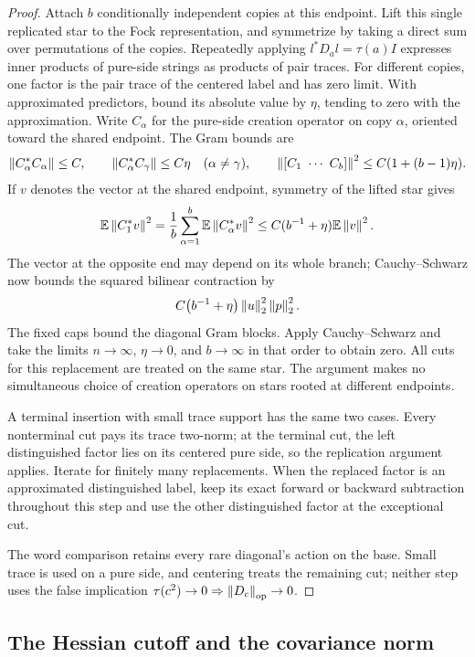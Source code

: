 \begin{proof}
Attach $b$ conditionally independent copies at this endpoint. Lift
this single replicated star to the Fock representation, and symmetrize
by taking a direct sum over permutations of the copies. Repeatedly
applying $l^*D_al=\tau(a)I$ expresses inner products of pure-side strings
as products of pair traces. For different copies, one factor is the
pair trace of the centered label and has zero limit. With approximated
predictors, bound its absolute value by $\eta$, tending to zero with
the approximation. Write $C_\alpha$ for the pure-side creation operator
on copy $\alpha$, oriented toward the shared endpoint. The Gram bounds
are
\[
 \left\lVert C_\alpha^*C_\alpha\right\rVert\leq C,\qquad
 \left\lVert C_\alpha^*C_\gamma\right\rVert\leq C\eta\quad(\alpha\ne\gamma),\qquad
 \left\lVert [C_1\ \cdots\ C_b]\right\rVert^2\leq C(1+(b-1)\eta).
\]
If $v$ denotes the vector at the shared endpoint, symmetry of the
lifted star gives
\[
 \mathbb E\left\lVert C_1^*v\right\rVert^2
 =\frac1b\sum_{\alpha=1}^b\mathbb E\left\lVert C_\alpha^*v\right\rVert^2
 \leq C(b^{-1}+\eta)\mathbb E\left\lVert v\right\rVert^2.
\]
The vector at the opposite end may depend on its whole branch;
Cauchy--Schwarz now bounds the squared bilinear contraction by
\[
 C\bigl(b^{-1}+\eta\bigr)\left\lVert u\right\rVert_2^2\left\lVert p\right\rVert_2^2.
\]
The fixed caps bound the diagonal Gram blocks. Apply Cauchy--Schwarz
and take the limits $n\to\infty$, $\eta\to0$, and $b\to\infty$ in
that order to obtain zero. All cuts for this replacement are treated
on the same star. The argument makes no simultaneous choice of
creation operators on stars rooted at different endpoints.

A terminal insertion with small trace support has the same two cases.
Every nonterminal cut pays its trace two-norm; at the terminal cut,
the left distinguished factor lies on its centered pure side, so the
replication argument applies. Iterate for finitely many replacements.
When the replaced factor is an approximated distinguished label,
keep its exact forward or backward subtraction throughout this step
and use the other distinguished factor at the exceptional cut.

The word comparison retains every rare diagonal's action on the base.
Small trace is used on a pure side, and centering treats the remaining
cut; neither step uses the false implication
$\tau(c^2)\to0\Rightarrow\left\lVert D_c\right\rVert_{\mathrm{op}}\to0$.
\end{proof}

\subsection{The Hessian cutoff and the covariance norm}
\label{subsec:hidden-covariance}

